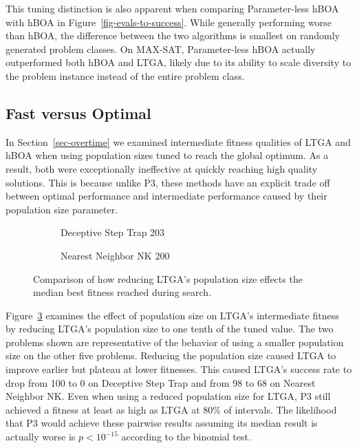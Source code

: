 This tuning distinction is also apparent when comparing Parameter-less hBOA with hBOA in Figure~\ref{fig-evals-to-success}.
While generally performing worse than hBOA, the difference between the two algorithms is smallest
on randomly generated problem classes. On MAX-SAT, Parameter-less hBOA actually outperformed both hBOA and LTGA,
likely due to its ability to scale diversity to the problem instance instead of the entire problem class.

\subsection{Fast versus Optimal}
\label{sec-fast-vs-optimal}

In Section~\ref{sec-overtime} we examined intermediate fitness qualities of LTGA and hBOA when using
population sizes tuned to reach the global optimum. As a result, both were exceptionally ineffective
at quickly reaching high quality solutions. This is because unlike P3, these methods have an explicit
trade off between optimal performance and intermediate performance caused by their population size parameter.

\begin{figure}[t]
  \begin{centering}
    \begin{subfigure}{.5\textwidth}
      \begin{centering}
      \end{centering}
      \caption{Deceptive Step Trap 203}
      \label{fig-small-pop-dst}
    \end{subfigure}%
    \begin{subfigure}{.5\textwidth}
      \begin{centering}
      \end{centering}
      \caption{Nearest Neighbor NK 200}
      \label{fig-small-pop-nk}
    \end{subfigure}
  \end{centering}
  \caption{Comparison of how reducing LTGA's population size effects
           the median best fitness reached during search.}
  \label{fig-small-pop}
\end{figure}

Figure~\ref{fig-small-pop} examines the effect of population size on LTGA's intermediate fitness by
reducing LTGA's population size to one tenth of the tuned value. The two problems shown are representative of the behavior of using
a smaller population size on the other five problems. Reducing the population size caused LTGA to improve earlier but plateau
at lower fitnesses. This caused LTGA's success rate to drop from 100 to 0 on Deceptive Step Trap and from 98 to 68 on Nearest
Neighbor NK.
Even when using a reduced population size for LTGA, P3 still achieved a fitness at
least as high as LTGA at 80\% of intervals.
The likelihood that P3 would achieve these pairwise results assuming its median result is actually worse is $p < 10^{-15}$
according to the binomial test.


